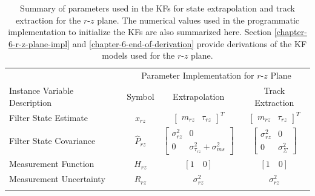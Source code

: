 \begin{table}[!t]
\caption{Summary of parameters used in the KFs for state extrapolation and track extraction for the $r$-$z$ plane. The numerical values used in the programmatic
implementation to initialize the KFs are also summarized here. Section \ref{chapter-6-r-z-plane-impl} and \ref{chapter-6-end-of-derivation} provide derivations of the KF models used for the $r$-$z$ plane.}

\begin{center}
\begin{tabular}{lccc}
\toprule

& \multicolumn{3}{c}{Parameter Implementation for $r$-$z$ Plane} \\
Instance Variable Description & Symbol  & Extrapolation  & Track Extraction  \\
\hline
\rule{0pt}{3ex}%


Filter State Estimate
& $\hat{x}_{rz}$
& $\begin{bmatrix} m_{rz} & \tau_{rz} \end{bmatrix}^{T}$
& $\begin{bmatrix} m_{rz} & \tau_{rz} \end{bmatrix}^{T}$
\\
\rule{0pt}{4ex}%

Filter State Covariance
& $\hat{P}_{rz}$
& $\begin{bmatrix} \sigma_{rz}^2 & 0 \\ 0 & \sigma_{\tau_{rz}}^2 + \sigma_{ms}^2\end{bmatrix}$
& $\begin{bmatrix} \sigma_{rz}^2 & 0 \\ 0 & \sigma_{\Sigma}^2\end{bmatrix}$
\\
\rule{0pt}{4ex}%


Measurement Function
& $\hat{H}_{rz}$ 
& $[1 \quad 0]$
& $[1 \quad 0]$
\\
\rule{0pt}{3ex}%

Measurement Uncertainty
& $\hat{R}_{rz}$ 
& $\sigma_{rz}^2$
& $\sigma_{rz}^2$
\\
\rule{0pt}{3ex}%


\end{tabular}
\end{center}
\end{table}
